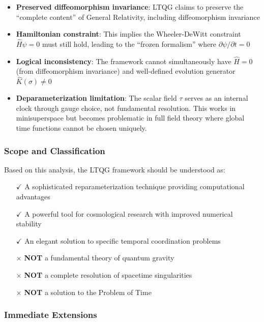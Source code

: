 \begin{itemize}
\item \textbf{Preserved diffeomorphism invariance}: LTQG claims to preserve the ``complete content'' of General Relativity, including diffeomorphism invariance
\item \textbf{Hamiltonian constraint}: This implies the Wheeler-DeWitt constraint $\hat{H}\psi = 0$ must still hold, leading to the ``frozen formalism'' where $\partial\psi/\partial t = 0$
\item \textbf{Logical inconsistency}: The framework cannot simultaneously have $\hat{H} = 0$ (from diffeomorphism invariance) and well-defined evolution generator $\hat{K}(\sigma) \neq 0$
\item \textbf{Deparameterization limitation}: The scalar field $\tau$ serves as an internal clock through gauge choice, not fundamental resolution. This works in minisuperspace but becomes problematic in full field theory where global time functions cannot be chosen uniquely.
\end{itemize}

\subsubsection{Scope and Classification}

Based on this analysis, the LTQG framework should be understood as:
\begin{itemize}
\item[$\checkmark$] A sophisticated reparameterization technique providing computational advantages
\item[$\checkmark$] A powerful tool for cosmological research with improved numerical stability  
\item[$\checkmark$] An elegant solution to specific temporal coordination problems
\item[$\times$] \textbf{NOT} a fundamental theory of quantum gravity
\item[$\times$] \textbf{NOT} a complete resolution of spacetime singularities
\item[$\times$] \textbf{NOT} a solution to the Problem of Time
\end{itemize}

\subsubsection{Immediate Extensions}

